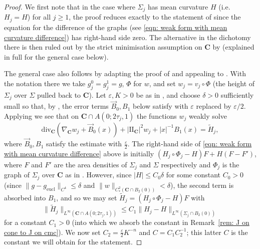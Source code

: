 \documentclass[12pt]{article}
\begin{document}
\begin{proof}
    We first note that in the case where $\Sigma_j$ has mean curvature $H$ (i.e.~$H_j = H$) for all $j \geq 1$, the proof reduces exactly to the statement of \cite[Lemma F.5]{LW25} since the equation for the difference of the graphs (see \eqref{eqn: weak form with mean curvature difference}) has right-hand side zero. The alternative in the dichotomy there is then ruled out by the strict minimisation assumption on $\mathbf{C}$ by \cite[Theorem 4.5(1)]{W20} (explained in full for the general case below).

    \bigskip

    The general case also follows by adapting the proof of \cite[Lemma F.5]{LW25} and appealing to \cite[Corollary 6.2]{LW25}. With the notation there we take $g_j^0 = g_j^1 = g$, $\Phi$ for $w$, and set $w_j = v_j \circ \Phi$ (the height of $\Sigma_j$ over $\Sigma$ pulled back to $\mathbf{C}$). Let $\varepsilon, K > 0$ be as in \cite[Corollary 6.2]{LW25}, and choose $\delta > 0$ sufficiently small so that, by \cite[Theorem B.1 and Remark 6.1]{LW25}, the error terms $\Vec{B}_0 ,B_1$ below satisfy \cite[(F.14)]{LW25} with $\varepsilon$ replaced by $\varepsilon/2$.
    Applying \cite[Theorem B.1]{LW25} we see that on $\mathbf{C} \cap A(0;2\tau_j,1)$ the functions $w_j$ weakly solve
    \begin{equation}\label{eqn: weak form with mean curvature difference}
        \mathrm{div}_\mathbf{C} (\nabla_\mathbf{C} w_j + \Vec{B}_0(x)) +|\mathrm{I\!I}_\mathbf{C}|^2 w_j + |x|^{-1} B_1(x) = \widetilde{H}_j,
    \end{equation}
    where $\Vec{B}_0 ,B_1$ satisfy the estimate \cite[(F.14)]{LW25} with $\frac{\varepsilon}{2}$. The right-hand side of \eqref{eqn: weak form with mean curvature difference} above is initially $(H_j\circ\Phi_j-H)F+H(F-F')$, where $F$ and $F'$ are the area densities of $\Sigma_j$ and $\Sigma$ respectively and $\Phi_j$ is the graph of $\Sigma_j$ over $\mathbf C$ as in \cite[Theorem B.1]{LW25}. However, since $|H|\le C_0\delta$ for some constant $C_0 > 0$ (since $\|g - g_{\mathrm{eucl}}\|_{C^4} \leq \delta$ and $\|w\|_{C^2_*(\mathbf{C} \cap B_2(0))} < \delta$), the second term is absorbed into $B_1$, and so we may set $\widetilde H_j =(H_j\circ\Phi_j-H)F$ with
    $$\|\widetilde{H}_j\|_{L^\infty(\mathbf{C} \cap A(0;2\tau_j,1))} \leq C_1\|H_j - H\|_{L^\infty(\Sigma_j \cap B_2(0))}$$ for a constant $C_1 > 0$ (into which we absorb the constant in Remark~\ref{rem: J on cone to J on cmc}). We now set $C_2=\frac{\varepsilon}{2}K^{-n}$ and $C=C_1C_2^{-1}$; this latter $C$ is the constant we will obtain for the statement.
    

\end{proof}
\end{document}
